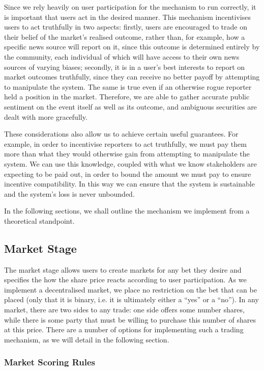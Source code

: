 Since we rely heavily on user participation for the mechanism to run correctly,
it is important that users act in the desired manner. This mechanism
incentivises users to act truthfully in two aspects: firstly, users are
encouraged to trade on their belief of the market's realised outcome, rather
than, for example, how a specific news source will report on it, since this
outcome is determined entirely by the community, each individual of which will
have access to their own news sources of varying biases; secondly, it is in a
user's best interests to report on market outcomes truthfully, since they can
receive no better payoff by attempting to manipulate the system. The same is
true even if an otherwise rogue reporter held a position in the market.
Therefore, we are able to gather accurate public sentiment on the event itself
as well as its outcome, and ambiguous securities are dealt with more gracefully.

These considerations also allow us to achieve certain useful guarantees. For
example, in order to incentivise reporters to act truthfully, we must pay them
more than what they would otherwise gain from attempting to manipulate the
system. We can use this knowledge, coupled with what we know stakeholders are
expecting to be paid out, in order to bound the amount we must pay to
ensure incentive compatibility. In this way we can ensure that the system is
sustainable and the system's loss is never unbounded.

In the following sections, we shall outline the mechanism we implement from a
theoretical standpoint. 

\subsection{Market Stage}

The market stage allows users to create markets for any bet they desire and
specifies the how the share price reacts according to user participation. As we
implement a decentralised market, we place no restriction on the bet that can
be placed (only that it is binary, i.e. it is ultimately either a ``yes'' or a
``no''). In any market, there are two sides to any trade: one side offers some
number shares, while there is some party that must be willing to purchase this
number of shares at this price. There are a number of options for implementing
such a trading mechanism, as we will detail in the following section.

\subsubsection{Market Scoring Rules}


